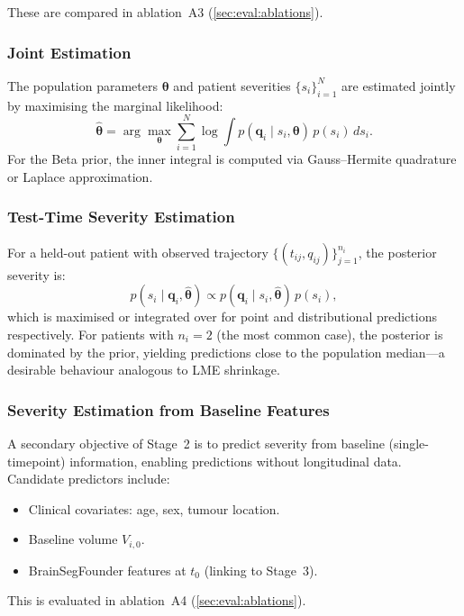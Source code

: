 These are compared in ablation~A3 (\cref{sec:eval:ablations}).

\subsubsection{Joint Estimation}

The population parameters $\boldsymbol{\theta}$ and patient severities
$\{s_i\}_{i=1}^N$ are estimated jointly by maximising the marginal
likelihood:
\begin{equation}
  \hat{\boldsymbol{\theta}} = \arg\max_{\boldsymbol{\theta}}
    \sum_{i=1}^{N} \log \int p(\mathbf{q}_i \mid s_i, \boldsymbol{\theta})
    \, p(s_i) \, ds_i.
  \label{eq:severity_mle}
\end{equation}
For the Beta prior, the inner integral is computed via Gauss--Hermite
quadrature or Laplace approximation.

\subsubsection{Test-Time Severity Estimation}

For a held-out patient with observed trajectory
$\{(t_{ij}, q_{ij})\}_{j=1}^{n_i}$, the posterior severity is:
\begin{equation}
  p(s_i \mid \mathbf{q}_i, \hat{\boldsymbol{\theta}}) \propto
    p(\mathbf{q}_i \mid s_i, \hat{\boldsymbol{\theta}}) \, p(s_i),
  \label{eq:severity_posterior}
\end{equation}
which is maximised or integrated over for point and distributional predictions
respectively. For patients with $n_i = 2$ (the most common case), the
posterior is dominated by the prior, yielding predictions close to the
population median---a desirable behaviour analogous to LME shrinkage.

\subsubsection{Severity Estimation from Baseline Features}

A secondary objective of Stage~2 is to predict severity from baseline
(single-timepoint) information, enabling predictions without longitudinal
data. Candidate predictors include:
\begin{itemize}[leftmargin=*]
  \item Clinical covariates: age, sex, tumour location.
  \item Baseline volume $V_{i,0}$.
  \item BrainSegFounder features at $t_0$ (linking to Stage~3).
\end{itemize}
This is evaluated in ablation~A4 (\cref{sec:eval:ablations}).

